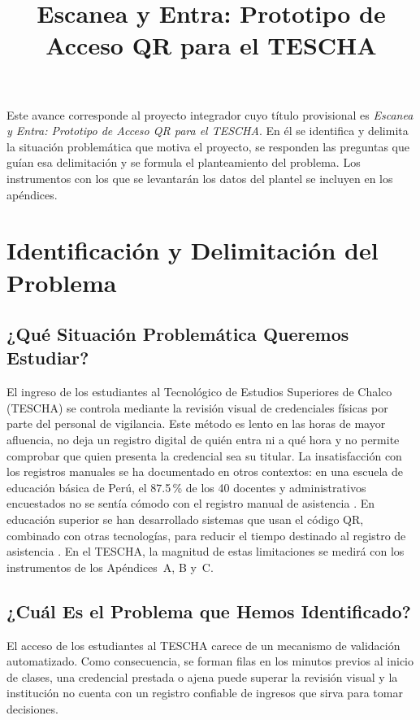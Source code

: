 \documentclass[stu,11pt,floatsintext,biblatex]{apa7}
\title{Escanea y Entra: Prototipo de Acceso QR para el TESCHA}
\begin{document}
\maketitle
\justifying

Este avance corresponde al proyecto integrador cuyo título provisional es
\textit{Escanea y Entra: Prototipo de Acceso QR para el TESCHA}. En él se
identifica y delimita la situación problemática que motiva el proyecto, se
responden las preguntas que guían esa delimitación y se formula el
planteamiento del problema. Los instrumentos con los que se levantarán los
datos del plantel se incluyen en los apéndices.

\clearpage
\section{Identificación y Delimitación del Problema}

\subsection{¿Qué Situación Problemática Queremos Estudiar?}
El ingreso de los estudiantes al Tecnológico de Estudios Superiores de Chalco
(TESCHA) se controla mediante la revisión visual de credenciales físicas por
parte del personal de vigilancia. Este método es lento en las horas de mayor
afluencia, no deja un registro digital de quién entra ni a qué hora y no
permite comprobar que quien presenta la credencial sea su titular. La
insatisfacción con los registros manuales se ha documentado en otros
contextos: en una escuela de educación básica de Perú, el 87.5\,\% de los 40
docentes y administrativos encuestados no se sentía cómodo con el registro
manual de asistencia \parencite{torres2019qr}. En educación superior se han
desarrollado sistemas que usan el código QR, combinado con otras tecnologías,
para reducir el tiempo destinado al registro de asistencia
\parencite{cano2026sistema}. En el TESCHA, la magnitud de estas limitaciones
se medirá con los instrumentos de los Apéndices~A, B y~C.

\subsection{¿Cuál Es el Problema que Hemos Identificado?}
El acceso de los estudiantes al TESCHA carece de un mecanismo de validación
automatizado. Como consecuencia, se forman filas en los minutos previos al
inicio de clases, una credencial prestada o ajena puede superar la revisión
visual y la institución no cuenta con un registro confiable de ingresos que
sirva para tomar decisiones.
\end{document}
